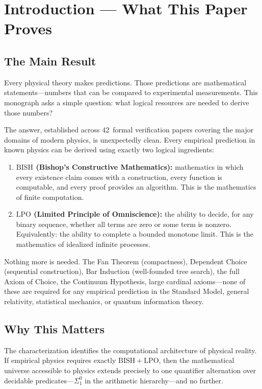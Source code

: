 \documentclass[11pt,a4paper]{report}
\theoremstyle{plain}
\theoremstyle{definition}
\theoremstyle{remark}
\newcommand{\BISH}{\mathrm{BISH}}
\newcommand{\LPO}{\mathrm{LPO}}
\begin{document}
\chapter{Introduction --- What This Paper Proves}

\section{The Main Result}

Every physical theory makes predictions. Those predictions are mathematical statements---numbers that can be compared to experimental measurements. This monograph asks a simple question: what logical resources are needed to derive those numbers?

The answer, established across 42~formal verification papers covering the major domains of modern physics, is unexpectedly clean. Every empirical prediction in known physics can be derived using exactly two logical ingredients:

\begin{enumerate}[nosep]
\item \textbf{$\BISH$ (Bishop's Constructive Mathematics):} mathematics in which every existence claim comes with a construction, every function is computable, and every proof provides an algorithm. This is the mathematics of finite computation.
\item \textbf{$\LPO$ (Limited Principle of Omniscience):} the ability to decide, for any binary sequence, whether all terms are zero or some term is nonzero. Equivalently: the ability to complete a bounded monotone limit. This is the mathematics of idealized infinite processes.
\end{enumerate}

Nothing more is needed. The Fan Theorem (compactness), Dependent Choice (sequential construction), Bar Induction (well-founded tree search), the full Axiom of Choice, the Continuum Hypothesis, large cardinal axioms---none of these are required for any empirical prediction in the Standard Model, general relativity, statistical mechanics, or quantum information theory.

\section{Why This Matters}

The characterization identifies the computational architecture of physical reality. If empirical physics requires exactly $\BISH+\LPO$, then the mathematical universe accessible to physics extends precisely to one quantifier alternation over decidable predicates---$\Sigma^0_1$ in the arithmetic hierarchy---and no further.
\end{document}
